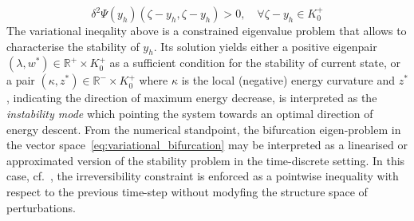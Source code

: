 \begin{equation}
     \label{eq:variational_stability}
     \delta^2 \Psi(y_h)(\zeta - y_h,  \zeta - y_h)  > 0, \quad \forall \zeta-y_h \in K^+_{0}
 \end{equation}
The variational ineqality above is a constrained eigenvalue problem that allows to characterise the stability of $y_h$. Its solution yields either a positive eigenpair $(\lambda, w^*)\in \mathbb{R}^+\times K^+_0$ as a sufficient condition for the stability of current state, or a pair $(\kappa, z^*)\in \mathbb{R}^-\times K^+_0$ where $\kappa$ is the local (negative) energy curvature and $z^*$, indicating the direction of maximum energy decrease, is interpreted as the \emph{instability mode} which pointing the system towards an optimal direction of energy descent. 
From the numerical standpoint, the bifurcation eigen-problem in the vector space~\eqref{eq:variational_bifurcation} may be interpreted as a linearised or approximated version of the stability problem in the time-discrete setting. In this case, cf.~\cite{Baldelli2021-gc}, the irreversibility constraint is enforced as a pointwise inequality with respect to the previous time-step without modyfing the structure space of perturbations.

